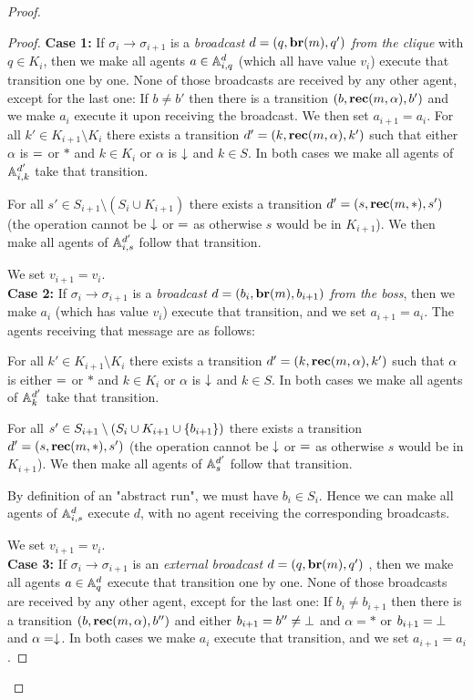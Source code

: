 \begin{proof}
\begin{proof}
	\textbf{Case 1: } If $\sigma_i \to \sigma_{i+1}$ is a \emph{broadcast $d = (q, \textbf{br}(m), q')$ from the clique} with $q \in K_i$, then we make all agents $a \in \mathbb{A}_{i,q}^{d}$ (which all have value $v_i$) execute that transition one by one.
	None of those broadcasts are received by any other agent, except for the last one:
	If $b \neq b'$ then there is a transition $(b, \textbf{rec}(m, \alpha), b')$ and we make $a_i$ execute it upon receiving the broadcast. We then set $a_{i+1} = a_i$.
	For all $k' \in K_{i+1} \setminus K_i$ there exists a transition $d'=(k, \textbf{rec}(m, \alpha), k')$ such that either $\alpha$ is ${=}$ or $*$ and $k \in K_i$ or $\alpha$ is $\downarrow$ and $k\in S$.
	In both cases we make all agents of $\mathbb{A}_{i,k}^{d'}$ take that transition.
	
	For all $s' \in S_{i+1} \setminus (S_i \cup K_{i+1})$ there exists a transition $d'=(s,\textbf{rec}(m, *),s')$ (the operation cannot be $\downarrow$ or ${=}$ as otherwise $s$ would be in $K_{i+1}$). We then make all agents of $\mathbb{A}_{i,s}^{d'}$ follow that transition. 
	
	We set $v_{i+1} = v_i$.
	\\
	
	\textbf{Case 2: }If $\sigma_i \to \sigma_{i+1}$ is a \emph{broadcast $d = (b_i, \textbf{br}(m), b_{i+1})$ from the boss}, then we make $a_i$ (which has value $v_i$) execute that transition, and we set $a_{i+1} = a_i$.
	The agents receiving that message are as follows:
	
	For all $k' \in K_{i+1} \setminus K_i $ there exists a transition $d'=(k, \textbf{rec}(m, \alpha), k')$ such that $\alpha$ is either ${=}$ or $*$ and $k \in K_i$ or $\alpha$ is $\downarrow$ and $k\in S$.
	In both cases we make all agents of $\mathbb{A}_k^{d'}$ take that transition.
	
	For all $s' \in S_{i+1} \setminus (S_i \cup K_{i+1} \cup \{b_{i+1}\})$ there exists a transition $d'=(s,\textbf{rec}(m, *),s')$ (the operation cannot be $\downarrow$ or ${=}$ as otherwise $s$ would be in $K_{i+1}$). We then make all agents of $\mathbb{A}_s^{d'}$ follow that transition. 
	
	By definition of an "abstract run", we must have $b_i \in S_i$.
	Hence we can make all agents of $\mathbb{A}_{i,s}^{d}$ execute $d$, with no agent receiving the corresponding broadcasts.
	
	We set $v_{i+1} = v_i$.
	\\
	
	\textbf{Case 3: } If $\sigma_i \to \sigma_{i+1}$ is an \emph{external broadcast} $d = (q, \textbf{br}(m), q')$ , then we make all agents $a \in \mathbb{A}_q^{d}$ execute that transition one by one. None of those broadcasts are received by any other agent, except for the last one:
	If $b_i \neq b_{i+1}$ then there is a transition $(b, \textbf{rec}(m, \alpha), b'')$ and either $b_{i+1} = b'' \neq \bot$ and $\alpha = *$ or $b_{i+1} = \bot$ and $\alpha=\downarrow$. In both cases we make $a_i$ execute that transition, and we set $a_{i+1} = a_i$.
	

\end{proof}
\end{proof}

